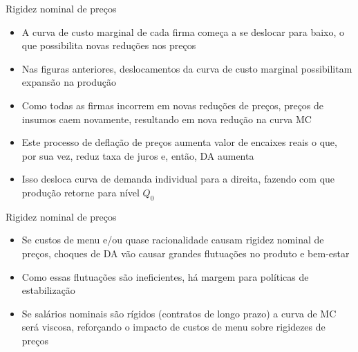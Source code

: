 \documentclass[10pt]{beamer}
\begin{document}
\begin{frame}{Rigidez nominal de preços}
    \begin{itemize}
        \item A curva de custo marginal de cada firma começa a se deslocar para baixo, o que possibilita novas reduções nos preços\bigskip
        \item Nas figuras anteriores, deslocamentos da curva de custo marginal possibilitam expansão na produção\bigskip
        \item Como todas as firmas incorrem em novas reduções de preços, preços de insumos caem novamente, resultando em nova redução na curva MC\bigskip
        \item Este processo de deflação de preços aumenta valor de encaixes reais o que, por sua vez, reduz taxa de juros e, então, DA aumenta\bigskip
        \item Isso desloca curva de demanda individual para a direita, fazendo com que produção retorne para nível $Q_0$
    \end{itemize}
\end{frame}

\begin{frame}{Rigidez nominal de preços}
    \begin{itemize}
        \item Se custos de menu e/ou quase racionalidade causam rigidez nominal de preços, choques de DA vão causar grandes flutuações no produto e bem-estar\bigskip
        \item Como essas flutuações são ineficientes, há margem para políticas de estabilização\bigskip
        \item Se salários nominais são rígidos (contratos de longo prazo) a curva de MC será viscosa, reforçando o impacto de custos de menu sobre rigidezes de preços
    \end{itemize}
\end{frame}

\end{document}
